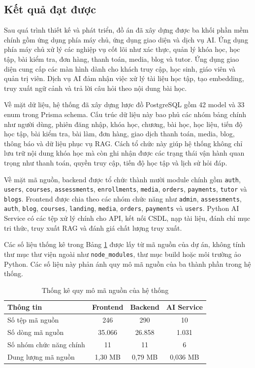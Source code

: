 \documentclass[../DoAn.tex]{subfiles}
\begin{document}
\subsection{Kết quả đạt được}
\label{subsection:4.3.2}

Sau quá trình thiết kế và phát triển, đồ án đã xây dựng được ba khối phần mềm chính gồm ứng dụng phía máy chủ, ứng dụng giao diện và dịch vụ AI. Ứng dụng phía máy chủ xử lý các nghiệp vụ cốt lõi như xác thực, quản lý khóa học, học tập, bài kiểm tra, đơn hàng, thanh toán, media, blog và tutor. Ứng dụng giao diện cung cấp các màn hình dành cho khách truy cập, học sinh, giáo viên và quản trị viên. Dịch vụ AI đảm nhận việc xử lý tài liệu học tập, tạo embedding, truy xuất ngữ cảnh và trả lời câu hỏi theo nội dung bài học.

Về mặt dữ liệu, hệ thống đã xây dựng lược đồ PostgreSQL gồm 42 model và 33 enum trong Prisma schema. Cấu trúc dữ liệu này bao phủ các nhóm bảng chính như người dùng, phiên đăng nhập, khóa học, chương, bài học, học liệu, tiến độ học tập, bài kiểm tra, bài làm, đơn hàng, giao dịch thanh toán, media, blog, thông báo và dữ liệu phục vụ RAG. Cách tổ chức này giúp hệ thống không chỉ lưu trữ nội dung khóa học mà còn ghi nhận được các trạng thái vận hành quan trọng như thanh toán, quyền truy cập, tiến độ học tập và lịch sử hỏi đáp.

Về mặt mã nguồn, backend được tổ chức thành mười module chính gồm \texttt{auth}, \texttt{users}, \texttt{courses}, \texttt{assessments}, \texttt{enrollments}, \texttt{media}, \texttt{orders}, \texttt{payments}, \texttt{tutor} và \texttt{blogs}. Frontend được chia theo các nhóm chức năng như \texttt{admin}, \texttt{assessments}, \texttt{auth}, \texttt{blog}, \texttt{courses}, \texttt{landing}, \texttt{media}, \texttt{orders}, \texttt{payments} và \texttt{users}. Python AI Service có các tệp xử lý chính cho API, kết nối CSDL, nạp tài liệu, đánh chỉ mục tri thức, truy xuất RAG và đánh giá chất lượng truy xuất.

Các số liệu thống kê trong Bảng \ref{table:thong_ke_ma_nguon} được lấy từ mã nguồn của dự án, không tính thư mục thư viện ngoài như \texttt{node\_modules}, thư mục build hoặc môi trường ảo Python. Các số liệu này phản ánh quy mô mã nguồn của ba thành phần trong hệ thống.

\begin{table}[H]
\centering
\caption{Thống kê quy mô mã nguồn của hệ thống}
\label{table:thong_ke_ma_nguon}
\small
\renewcommand{\arraystretch}{1.35}
\setlength{\tabcolsep}{8pt}
\begin{tabular}{|p{5.6cm}|c|c|c|}
\hline
\textbf{Thông tin} & \textbf{Frontend} & \textbf{Backend} & \textbf{AI Service} \\ \hline
Số tệp mã nguồn & 246 & 290 & 10 \\ \hline
Số dòng mã nguồn & 35.066 & 26.858 & 1.031 \\ \hline
Số nhóm chức năng chính & 11 & 11 & 6 \\ \hline
Dung lượng mã nguồn & 1,30 MB & 0,79 MB & 0,036 MB \\ \hline
\end{tabular}
\end{table}
\end{document}
